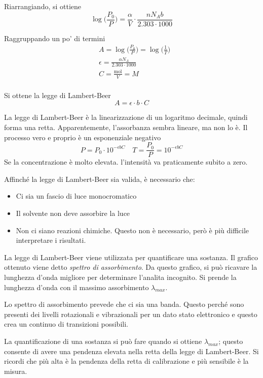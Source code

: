 Riarrangiando, si ottiene
\[
\log \biggl(\frac{P_0}{P}\biggr) = \frac{\alpha}{V} \cdot \frac{n N_A b}{2.303 \cdot 1000}
\]

Raggruppando un po' di termini
\begin{align*}
& A = \log \biggl(\frac{P_0}{P}\biggr) = \log \biggl(\frac{1}{T}\biggr)\\
& \epsilon = \frac{\alpha N_A}{2.303 \cdot 1000}\\
& C = \frac{\text{mol}}{V} = M\\
\end{align*}

Si ottene la legge di Lambert-Beer
\[
A = \epsilon \cdot b \cdot C
\]

La legge di Lambert-Beer è la linearizzazione di un logaritmo decimale, quindi forma una retta. Apparentemente, l'assorbanza sembra lineare, ma non lo è.
Il processo vero e proprio è un esponenziale negativo
\[
P = P_0 \cdot 10^{-\epsilon b C} \quad T = \frac{P_0}{P} = 10^{-\epsilon b C}
\]
Se la concentrazione è molto elevata. l'intensità va praticamente subito a zero.


Affinché la legge di Lambert-Beer sia valida, è necessario che:
\begin{itemize}
\item Ci sia un fascio di luce monocromatico
\item Il solvente non deve assorbire la luce
\item Non ci siano reazioni chimiche. Questo non è necessario, però è più difficile interpretare i risultati.
\end{itemize}

La legge di Lambert-Beer viene utilizzata per quantificare una sostanza. Il grafico ottenuto viene detto \emph{spettro di assorbimento}.
Da questo grafico, si può ricavare la lunghezza d'onda migliore per determinare l'analita incognito. Si prende la lunghezza d'onda con il massimo assorbimento $\lambda_{max}$.

Lo spettro di assorbimento prevede che ci sia una banda.
Questo perché sono presenti dei livelli rotazionali e vibrazionali per un dato stato elettronico e questo crea un continuo di transizioni possibili.

La quantificazione di una sostanza si può fare quando si ottiene $\lambda_{max}$; questo consente di avere una pendenza elevata nella retta della legge di Lambert-Beer.
Si ricordi che più alta è la pendenza della retta di calibrazione e più sensibile è la misura.

